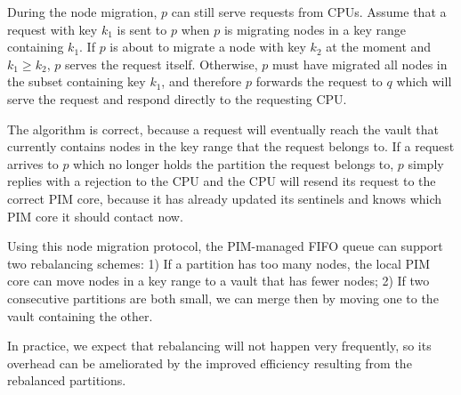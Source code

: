 During the node migration, $p$ can still serve requests from CPUs.
Assume that a request with key $k_1$ is sent to $p$ when $p$ is migrating nodes 
in a key range containing $k_1$.  
If $p$ is about to migrate a node with key $k_2$ at the moment and $k_1 \ge k_2$, 
$p$ serves the request itself. 
Otherwise, $p$ must have migrated all nodes in the subset containing key $k_1$, and therefore $p$ 
forwards the request to $q$ which will serve the request and respond directly to the requesting CPU. 

The algorithm is correct, because a request will eventually reach the vault that 
currently contains nodes in the key range that the request belongs to. 
If a request arrives to $p$ which no longer holds the partition the request belongs to, 
$p$ simply replies with a rejection to the CPU and the CPU will resend its request to 
the correct PIM core, 
because it has already updated its sentinels and knows which PIM core it should contact now. 

Using this node migration protocol, the PIM-managed FIFO queue can support two rebalancing schemes:
1) If a partition has too many nodes, the local PIM core can move nodes in a key range to a vault 
that has fewer nodes;
2) If two consecutive partitions are both small, 
we can merge then by moving one to the vault containing the other. 

In practice, we expect that rebalancing will not happen very frequently, so its overhead can be 
ameliorated by the improved efficiency resulting from the rebalanced partitions. 

